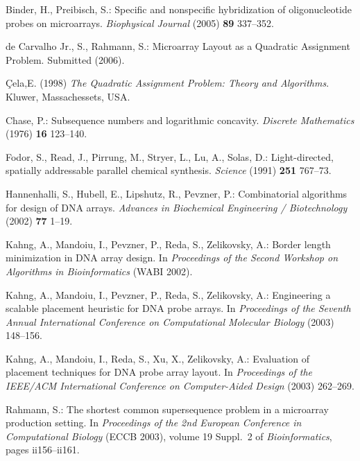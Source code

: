 \documentclass{llncs}
\newcommand{\ignore}[1]{}
\begin{document}
\begin{thebibliography}{5}

Binder, H., Preibisch, S.:
Specific and nonspecific hybridization of oligonucleotide probes on microarrays.
{\it Biophysical Journal} (2005) {\bf 89} 337--352.

de Carvalho Jr., S., Rahmann, S.:
Microarray Layout as a Quadratic Assignment Problem.
Submitted (2006).

 \c{C}ela,E. (1998) {\it The Quadratic Assignment Problem: Theory
and Algorithms}. Kluwer, Massachessets, USA.

Chase, P.:
Subsequence numbers and logarithmic concavity.
{\it Discrete Mathematics} (1976) {\bf 16} 123--140.

\ignore{
\bibitem{FELDMAN93}
Feldman, W., Pevzner, P.:
Gray code masks for sequencing by hybridization.
{\it Genomics} (1994) {\bf 23} 233--235.
}

Fodor, S., Read, J., Pirrung, M., Stryer, L., Lu, A., Solas, D.:
Light-directed, spatially addressable parallel chemical synthesis.
{\it Science} (1991) {\bf 251} 767--73.

Hannenhalli, S., Hubell, E., Lipshutz, R., Pevzner, P.:
Combinatorial algorithms for design of DNA arrays.
{\it Advances in Biochemical Engineering / Biotechnology} (2002) {\bf 77} 1--19.

Kahng, A., Mandoiu, I., Pevzner, P., Reda, S., Zelikovsky, A.:
Border length minimization in DNA array design.
In {\it Proceedings of the Second Workshop on Algorithms in Bioinformatics} (WABI 2002).

Kahng, A., Mandoiu, I., Pevzner, P., Reda, S., Zelikovsky, A.:
Engineering a scalable placement heuristic for DNA probe arrays.
In {\it Proceedings of the Seventh Annual International Conference on Computational
Molecular Biology} (2003) 148--156.

Kahng, A., Mandoiu, I., Reda, S., Xu, X., Zelikovsky, A.:
Evaluation of placement techniques for DNA probe array layout.
In {\it Proceedings of the IEEE/ACM International Conference on Computer-Aided Design}
(2003) 262--269.

Rahmann, S.:
The shortest common supersequence problem in a microarray production setting.
In {\it Proceedings of the 2nd European Conference in Computational Biology}
({ECCB} 2003), volume 19 Suppl.~2 of {\it Bioinformatics}, pages ii156--ii161.

\end{thebibliography}
\end{document}
